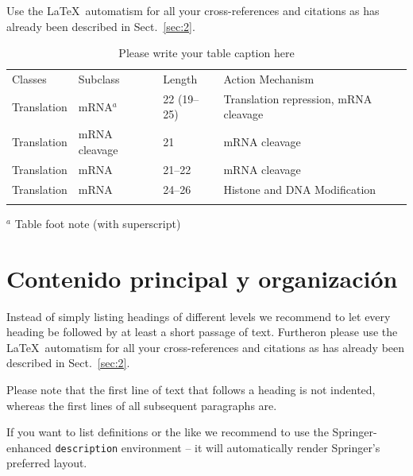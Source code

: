  Use the \LaTeX\ automatism for all your cross-refer\-ences and citations as has already been described in Sect.~\ref{sec:2}.
%
%
\begin{table}[!t]
    \caption{Please write your table caption here}
    \label{tab:1}       %
    \begin{tabular}{p{2cm}p{2.4cm}p{2cm}p{4.9cm}}
        \hline\noalign{\smallskip}
        Classes     & Subclass      & Length      & Action Mechanism                      \\
        \noalign{\smallskip}\svhline\noalign{\smallskip}
        Translation & mRNA$^a$      & 22 (19--25) & Translation repression, mRNA cleavage \\
        Translation & mRNA cleavage & 21          & mRNA cleavage                         \\
        Translation & mRNA          & 21--22      & mRNA cleavage                         \\
        Translation & mRNA          & 24--26      & Histone and DNA Modification          \\
        \noalign{\smallskip}\hline\noalign{\smallskip}
    \end{tabular}
    $^a$ Table foot note (with superscript)
\end{table}
%
\section{Contenido principal y organización}
\label{sec:3}
Instead of simply listing headings of different levels we recommend to let every heading be followed by at least a short passage of text. Furtheron please use the \LaTeX\ automatism for all your cross-references and citations as has already been described in Sect.~\ref{sec:2}.

Please note that the first line of text that follows a heading is not indented, whereas the first lines of all subsequent paragraphs are.

If you want to list definitions or the like we recommend to use the Springer-enhanced \verb|description| environment -- it will automatically render Springer's preferred layout.

